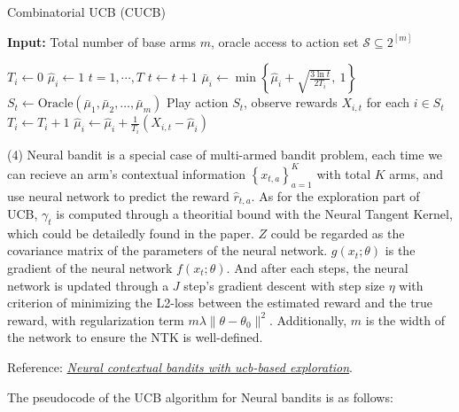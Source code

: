 \vspace{-0.3cm}
\begin{algorithm}[h]
    \caption{Combinatorial UCB (CUCB)}
    \textbf{Input:} Total number of base arms $m$, oracle access to action set $\mathcal{S} \subseteq 2^{[m]}$
    \begin{algorithmic}[1]
        \State $T_i \gets 0$ 
        \State $\hat{\mu}_i \gets 1$ 
    \EndFor
    \For $t = 1,\cdots, T$
        \State $t \gets t + 1$
            \State $\bar{\mu}_i \gets \min \left\{ \hat{\mu}_i + \sqrt{\frac{3 \ln t}{2 T_i}},\ 1 \right\}$
        \EndFor
        \State $S_t \gets \text{Oracle}(\bar{\mu}_1, \bar{\mu}_2, \dots, \bar{\mu}_m)$ 
        \State Play action $S_t$, observe rewards $X_{i,t}$ for each $i \in S_t$
            \State $T_i \gets T_i + 1$
            \State $\hat{\mu}_i \gets \hat{\mu}_i + \frac{1}{T_i}(X_{i,t} - \hat{\mu}_i)$ 
        \EndFor
    \EndFor
    \end{algorithmic}
\end{algorithm}

(4) Neural bandit is a special case of multi-armed bandit problem, each time we can recieve an arm's contextual information $\left\{x_{t,a}\right\}_{a=1}^K$ with total $K$ arms, and use neural network to predict the reward $\hat{r}_{t,a}$. As for the exploration part of UCB, $\gamma_t$ is computed through a theoritial bound with the Neural Tangent Kernel, which could be detailedly found in the paper. $Z$ could be regarded as the covariance matrix of the parameters of the neural network. $g(x_t;\theta)$ is the gradient of the neural network $f(x_t;\theta)$. And after each steps, the neural network is updated through a $J$ step's gradient descent with step size $\eta$ with criterion of minimizing the L2-loss between the estimated reward and the true reward, with regularization term $m\lambda\|\theta-\theta_0\|^2$. Additionally, $m$ is the width of the network to ensure the NTK is well-defined.

Reference: \href{https://arxiv.org/abs/1407.8339}{\textit{Neural contextual bandits with ucb-based exploration}}.

The pseudocode of the UCB algorithm for Neural bandits is as follows:

